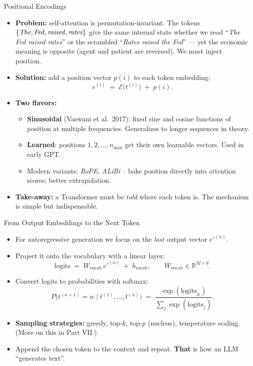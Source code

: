 \documentclass[10pt,english,aspectratio=169]{beamer}
\begin{document}
\begin{frame}{Positional Encodings}
\begin{itemize}
\item \textbf{Problem:} self-attention is permutation-invariant. The tokens $\{\text{\emph{The}}, \text{\emph{Fed}}, \text{\emph{raised}}, \text{\emph{rates}}\}$ give the same internal state whether we read ``\emph{The Fed raised rates}'' or the scrambled ``\emph{Rates raised the Fed}'' --- yet the economic meaning is opposite (agent and patient are reversed). We must inject position.

\medskip
\item \textbf{Solution:} add a position vector $p(i)$ to each token embedding:
\[
   e^{(i)} \;=\; \mathcal{E}\bigl(t^{(i)}\bigr) \;+\; p(i).
\]

\medskip
\item \textbf{Two flavors:}
\begin{itemize}
    \item \textbf{Sinusoidal} (Vaswani et al.\ 2017): fixed sine and cosine functions of position at multiple frequencies. Generalizes to longer sequences in theory.
    \item \textbf{Learned}: positions $1, 2, \ldots, n_{\max}$ get their own learnable vectors. Used in early GPT.
    \item Modern variants: \emph{RoPE}, \emph{ALiBi} -- bake position directly into attention scores; better extrapolation.
\end{itemize}

\medskip
\item \textbf{Take-away:} a Transformer must be \emph{told} where each token is. The mechanism is simple but indispensable.
\end{itemize}
\end{frame}

\begin{frame}{From Output Embeddings to the Next Token}
\begin{itemize}
\item For autoregressive generation we focus on the \emph{last} output vector $e'^{(n)}$.

\medskip
\item Project it onto the vocabulary with a linear layer:
\[
   \text{logits} \;=\; W_{\text{vocab}}\, e'^{(n)} \;+\; b_{\text{vocab}}, \qquad W_{\text{vocab}} \in \mathbb{R}^{M \times d}.
\]

\medskip
\item Convert logits to probabilities with softmax:
\[
   P\bigl(t^{(n+1)} = w \mid t^{(1)}, \ldots, t^{(n)}\bigr) \;=\; \frac{\exp(\text{logits}_{w})}{\sum_{j} \exp(\text{logits}_{j})}.
\]

\medskip
\item \textbf{Sampling strategies:} greedy, top-$k$, top-$p$ (nucleus), temperature scaling. (More on this in Part VII.)

\medskip
\item Append the chosen token to the context and repeat. \textbf{That} is how an LLM ``generates text''.
\end{itemize}
\end{frame}
\end{document}
